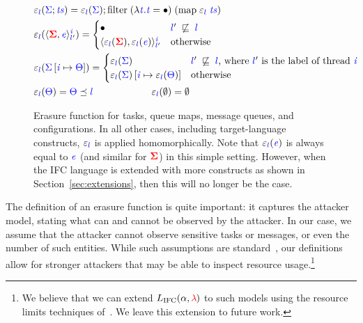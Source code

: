 \documentclass{llncs}
\newcommand{\Varid}[1]{\mathit{#1}}
\newcommand{\Red}[1]{{\color{red} #1}}
\begin{document}
\begin{figure} \begin{align*}
  &\ensuremath{\varepsilon_{\ifc{l}}(\ifc{\Sigma};\ifc{\Varid{ts}})\mathrel{=}\varepsilon_{\ifc{l}}(\ifc{\Sigma});\text{filter}\;(\lambda \ifc{\Varid{t}}.\ifc{\Varid{t}}\mathrel{=}\bullet)\;(\text{map}\;\varepsilon_{\ifc{l}}\;\ifc{\Varid{ts}})}\\
  &\ensuremath{\varepsilon_{\ifc{l}}(\langle \tar{\Sigma}, \ifc{\Varid{e}}\rangle^{\ifc{\Varid{i}}}_{\ifc{l}'})\mathrel{=}} \begin{cases}
    \ensuremath{\bullet} & \ensuremath{\ifc{l}'\;\not\flows{}\;\ifc{l}} \\
    \ensuremath{\langle \varepsilon_{\ifc{l}}(\tar{\Sigma}), \varepsilon_{\ifc{l}}(\ifc{\Varid{e}})\rangle^{\ifc{\Varid{i}}}_{\ifc{l}'}} & \text{otherwise}
  \end{cases} \\
  &\ensuremath{\varepsilon_{\ifc{l}}(\ifc{\Sigma}\left[\ifc{\Varid{i}}\mapsto{}\ifc{\Theta}\right])\mathrel{=}} \begin{cases}
    \ensuremath{\varepsilon_{\ifc{l}}(\ifc{\Sigma})} & \text{\ensuremath{\ifc{l}'\;\not\flows{}\;\ifc{l}}, where \ensuremath{\ifc{l}'} is the label of thread \ensuremath{\ifc{\Varid{i}}}}\\
    \ensuremath{\varepsilon_{\ifc{l}}(\ifc{\Sigma})\left[\ifc{\Varid{i}}\mapsto{}\varepsilon_{\ifc{l}}(\ifc{\Theta})\right]} & \text{otherwise}
  \end{cases} \\
  &\ensuremath{\varepsilon_{\ifc{l}}(\ifc{\Theta})\mathrel{=}\ifc{\Theta}\preceq\ifc{l}}  \qquad\qquad\qquad  \ensuremath{\varepsilon_{\ifc{l}}(\emptyset)\mathrel{=}\emptyset}
\end{align*}
\vspace*{-0.8cm}
\caption{ Erasure function for tasks, queue maps, message queues, and
configurations.  In all other cases, including target-language constructs,
\ensuremath{\varepsilon_{\ifc{l}}} is applied homomorphically.
Note that \ensuremath{\varepsilon_{\ifc{l}}(\ifc{\Varid{e}})} is always equal to \ensuremath{\ifc{\Varid{e}}} (and similar for \ensuremath{\tar{\Sigma}})
in this simple setting.  However,
when the IFC language is extended with more constructs as shown in
Section~\ref{sec:extensions}, then this will no longer be the case.
\label{fig:erasure} }
\end{figure}

The definition of an erasure function is quite important: it captures
the attacker model, stating what can and cannot be observed by the attacker.
In our case, we assume that the attacker cannot observe sensitive tasks or
messages, or even the number of such entities.
While such assumptions are standard~\cite{Castellani:Boudol:ICALP01,
stefan:addressing-covert}, our definitions allow for
stronger attackers that may be able to inspect resource usage.\footnote{
  We believe that we can extend \ensuremath{L_\text{IFC}(\alpha,\Red{\lambda}\;\!\!)} to
  such models using the resource limits techniques of~\cite{yangresource}.
We leave this extension to future work.
}
\end{document}
